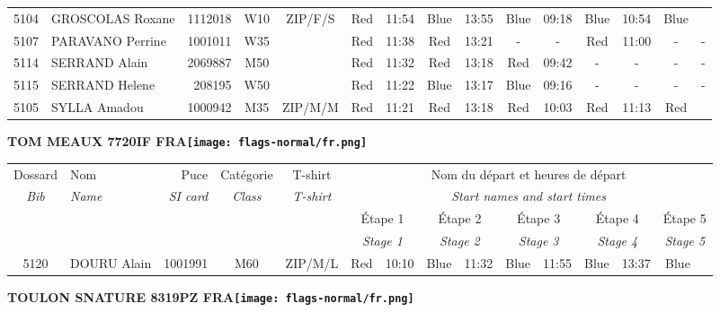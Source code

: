 \documentclass{report}
\begin{document}
\begin{longtable}{|c|l|r|c|c|*{5}{cc|}}
    5104 & GROSCOLAS Roxane & 1112018 & W10 & ZIP/F/S & Red & 11:54 & Blue & 13:55 & Blue & 09:18 & Blue & 10:54 & Blue &  \\
    5107 & PARAVANO Perrine & 1001011 & W35 &   & Red & 11:38 & Red & 13:21 & - &  - & Red & 11:00 & - &  -\\
    5114 & SERRAND Alain & 2069887 & M50 &   & Red & 11:32 & Red & 13:18 & Red & 09:42 & - &  - & - &  -\\
    5115 & SERRAND Helene & 208195 & W50 &   & Red & 11:22 & Blue & 13:17 & Blue & 09:16 & - &  - & - &  -\\
    5105 & SYLLA Amadou & 1000942 & M35 & ZIP/M/M & Red & 11:21 & Red & 13:18 & Red & 10:03 & Red & 11:13 & Red &  \\
  \end{longtable}
\newpage
  \Huge \centering \bfseries TOM MEAUX 7720IF FRA\normalfont \footnotesize \sffamily \hfill \texttt{[image: flags-normal/fr.png]} \newline 
  \begin{longtable}{|c|l|r|c|c|*{5}{cc|}}
    Dossard & Nom  & Puce    & Catégorie & T-shirt & \multicolumn{10}{c|}{Nom du départ et heures de départ} \\
    \itshape Bib     & \itshape Name & \itshape SI card & \itshape Class  & \itshape  T-shirt  & \multicolumn{10}{c|}{\itshape Start names and start times} \\
    \hline
    & & & & & \multicolumn{2}{c|}{Étape 1} & \multicolumn{2}{c|}{Étape 2} & \multicolumn{2}{c|}{Étape 3} & \multicolumn{2}{c|}{Étape 4} & \multicolumn{2}{c|}{Étape 5} \\
    & & & & & \multicolumn{2}{c|}{\itshape Stage 1} & \multicolumn{2}{c|}{\itshape Stage 2} & \multicolumn{2}{c|}{\itshape Stage 3} & \multicolumn{2}{c|}{\itshape Stage 4} & \multicolumn{2}{c|}{\itshape Stage 5} \\
    \hline
    5120 & DOURU Alain & 1001991 & M60 & ZIP/M/L & Red & 10:10 & Blue & 11:32 & Blue & 11:55 & Blue & 13:37 & Blue &  \\
  \end{longtable}
\newpage
  \Huge \centering \bfseries TOULON SNATURE 8319PZ FRA\normalfont \footnotesize \sffamily \hfill \texttt{[image: flags-normal/fr.png]} \newline 
\end{document}
